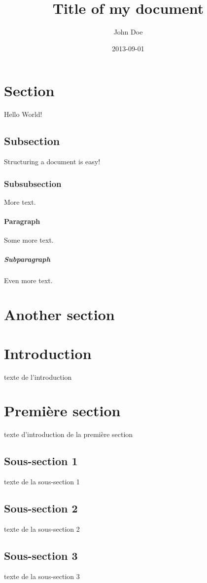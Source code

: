 \documentclass[a4paper,11pt]{article}
\title{Title of my document}
\date{2013-09-01}
\author{John Doe}
\begin{document}
	\maketitle
	\newpage
	\tableofcontents
	\newpage

	\section{Section}
		Hello World!
		\subsection{Subsection}
			Structuring a document is easy!
			\subsubsection{Subsubsection}
				More text.
				\paragraph{Paragraph}
					Some more text.
					\subparagraph{Subparagraph}
						Even more text.
	\section{Another section}

\section*{Introduction}
      texte de l’introduction

   \section{Première section}
      texte d’introduction de la première section
      \subsection{Sous-section 1}
         texte de la sous-section 1
      \subsection{Sous-section 2}
         texte de la sous-section 2
      \subsection{Sous-section 3}
         texte de la sous-section 3
   
\end{document}
